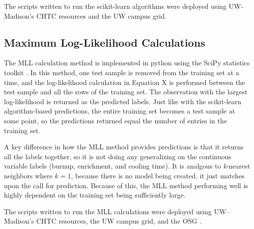 The scripts written to run the scikit-learn algorithms were deployed using
\gls{UW}-Madison's \gls{CHTC} resources and the \gls{UW} campus grid. 

\subsection{Maximum Log-Likelihood Calculations}

The \gls{MLL} calculation method is implemented in python using the SciPy
statistics toolkit \cite{scipy}. In this method, one test sample is removed
from the training set at a time, and the log-likelihood calculation in Equation
X  is performed between the test sample and all the rows of
the training set.  The observation with the largest log-likelihood is returned
as the predicted labels. Just like with the scikit-learn algorithm-based 
predictions, the entire training set becomes a test sample at some point, so
the predictions returned equal the number of entries in the training set.

A key difference in how the \gls{MLL} method provides predictions is that it
returns all the labels together, so it is not doing any generalizing on the
continuous variable labels (burnup, enrichment, and cooling time). It is
analgous to \textit{k}-nearest neighbors where $k = 1$, because there is no
model being created, it just matches upon the call for prediction. Because of
this, the \gls{MLL} method performing well is highly dependent on the training
set being sufficiently large. 

The scripts written to run the \gls{MLL} calculations were deployed using
\gls{UW}--Madison's \gls{CHTC} resources, the \gls{UW} campus grid, and the 
\gls{OSG} \cite{osg07, osg09}. 
